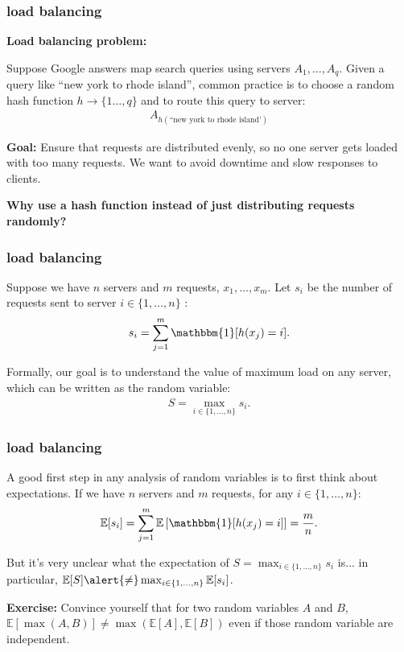 \documentclass[handout,compress]{beamer}
\newcommand{\E}{\mathbb{E}}
\begin{document}
\begin{frame}
	\frametitle{load balancing}
	\textbf{Load balancing problem:}
	
	Suppose Google answers map search queries using servers $A_1, \ldots, A_q$. Given a query like ``new york to rhode island'', common practice is to choose a random hash function $h \rightarrow \{1\ldots, q\}$ and to route this query to server:
	\begin{align*}
		A_{h(\text{``new york to rhode island'})}
	\end{align*}

	\textbf{Goal:} Ensure that requests are distributed evenly, so no one server gets loaded with too many requests. We want to avoid  downtime and slow responses to clients. 
	
	\begin{center}
		\alert{\textbf{Why use a hash function instead of just distributing requests randomly?}}
	\end{center}
	

\end{frame}

\begin{frame}
	\frametitle{load balancing}
	Suppose we have $n$ servers and $m$ requests, $x_1,\ldots, x_m$. Let $s_i$ be the number of requests sent to server $i \in \{1,\ldots, n\}$ :
	\begin{align*}
		s_i = \sum_{j=1}^m \mathbbm{1}[h(x_j) = i]. 
	\end{align*}
	
	Formally, our goal is to understand the value of maximum load on any server, which can be written as the random variable:
	\begin{align*}
		S = \max_{i\in \{1,\ldots, n\}} s_i.
	\end{align*}	
\end{frame}

\begin{frame}
	\frametitle{load balancing}
	A good first step in any analysis of random variables is to first think about expectations. 
	If we have $n$ servers and $m$ requests, for any $i\in \{1,\ldots, n\}$:
	\begin{align*}
		\E[s_i] = \sum_{j=1}^m \E\left[\mathbbm{1}[h(x_j) = i]\right] = \frac{m}{n}.
	\end{align*}
	
	But it's very unclear what the expectation of $S = \max_{i\in \{1,\ldots, n\}} s_i$ is... in particular, $\E[S] \alert{\neq} \max_{i\in \{1,\ldots, n\}} \E[s_i]$. 
	
	\textbf{Exercise:} Convince yourself that for two random variables $A$ and $B$, $\E[\max(A,B)] \neq \max(\E[A], \E[B])$ even if those random variable are independent. 
\end{frame}
\end{document}

